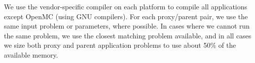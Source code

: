 We use the vendor-specific compiler on each platform to compile all applications except OpenMC (using GNU compilers). For each proxy/parent pair, we use the same input problem or parameters, where possible. In cases where we cannot run the same problem, we use the closest matching problem available, and in all cases we size both proxy and parent application problems to use about 50\% of the available memory. 
